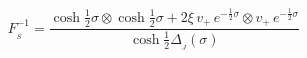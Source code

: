 \begin{equation}\label{boro2210}
F_{_{\!S}}^{-1} = \frac{\cosh\frac{1}{2}\sigma\otimes\cosh\frac{1}{2}\sigma
+2\xi\,v_{+}\,e^{-\frac{1}{2}\sigma}\otimes v_+\,e^{-\frac{1}{2}\sigma}}
{\cosh\frac{1}{2}\Delta_{_{\!J}}(\sigma)}\,
\end{equation}

